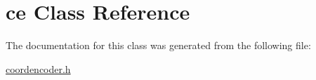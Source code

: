 \hypertarget{classce}{}\section{ce Class Reference}
\label{classce}


The documentation for this class was generated from the following file\+:\begin{DoxyCompactItemize}
\item 
\mbox{\hyperlink{coordencoder_8h}{coordencoder.\+h}}\end{DoxyCompactItemize}
